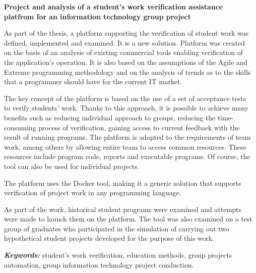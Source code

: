\vfill

\pagebreak

\begin{center}
    \textbf{Project and analysis of a student's work verification assistance platfrom for an information technology group project}
\end{center}
 \newline

As part of the thesis, a platform supporting the verification of student work was defined, implemented and examined.
It is a new solution.
Platform was created on the basis of an analysis of existing commercial tools enabling verification of the application's operation.
It is also based on the assumptions of the Agile and Extreme programming methodology and on the analysis of trends as to the skills that a programmer should have for the current IT market.

The key concept of the platform is based on the use of a set of acceptance tests to verify students' work.
Thanks to this approach, it is possible to achieve many benefits such as reducing individual approach to groups, reducing the time-consuming process of verification, gaining access to current feedback with the result of running programs.
The platform is adapted to the requirements of team work, among others by allowing entire team to access common resources.
These resources include program code, reports and executable programs.
Of course, the tool can also be used for individual projects.

The platform uses the Docker tool, making it a generic solution that supports verification of project work in any programming language.

As part of the work, historical student programs were examined and attempts were made to launch them on the platform.
The tool was also examined on a test group of graduates who participated in the simulation of carrying out two hypothetical student projects developed for the purpose of this work.\newline


\textit{\textbf{Keywords:}} student's work verification, education methods, group projects automation, group information technology project conduction.


\vfill


\cleardoublepage

